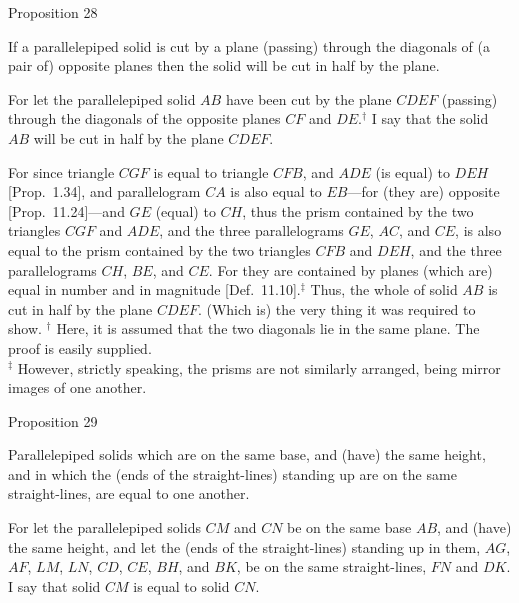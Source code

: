 \begin{center}
{\large Proposition 28}
\end{center}

If a parallelepiped solid is cut by a plane (passing) through the diagonals of  (a pair of) opposite planes then the solid will be cut in half by the
plane.

\epsfysize=1.8in
\centerline{}

For let the parallelepiped solid $AB$ have been cut by the plane
$CDEF$ (passing) through the diagonals of the opposite planes $CF$ and $DE$.$^\dag$
I say that the solid $AB$ will be cut in half by the plane $CDEF$.

For since triangle $CGF$ is equal to triangle $CFB$, and $ADE$ (is equal)
to $DEH$ [Prop.~1.34], and parallelogram
$CA$ is also equal to $EB$---for (they are) opposite [Prop.~11.24]---and $GE$ (equal) to $CH$,  thus the prism contained
by the two triangles $CGF$ and $ADE$, and the three parallelograms $GE$, $AC$, and $CE$, is also equal to the prism contained by the two
triangles $CFB$ and $DEH$, and the three parallelograms $CH$, $BE$, and
$CE$. For they are contained by planes (which are) equal in number and in magnitude
[Def.~11.10].$^\ddag$ Thus, the whole of solid $AB$
is cut in half by the plane $CDEF$. (Which is) the very thing it was required to show.
{\footnotesize\noindent$^\dag$ Here, it is assumed that the two diagonals lie in the same plane. The proof is easily supplied.\\
\noindent$^\ddag$ However, strictly speaking, the prisms are not similarly arranged, being mirror images of one another.}


\begin{center}
{\large Proposition 29}
\end{center}

Parallelepiped solids which are on the same base,
and (have) the same height, and in which the (ends of the straight-lines) standing up are on the same straight-lines, 
are equal to one another.

\epsfysize=1.7in
\centerline{}

For let the parallelepiped solids $CM$ and $CN$ be on the same base $AB$,
and (have) the same height, and let the (ends of the straight-lines)
standing up in them, $AG$, $AF$, $LM$, $LN$, $CD$, $CE$, $BH$, and $BK$,
be  on the same straight-lines, $FN$ and $DK$. I say that  solid $CM$
is equal to solid $CN$.

